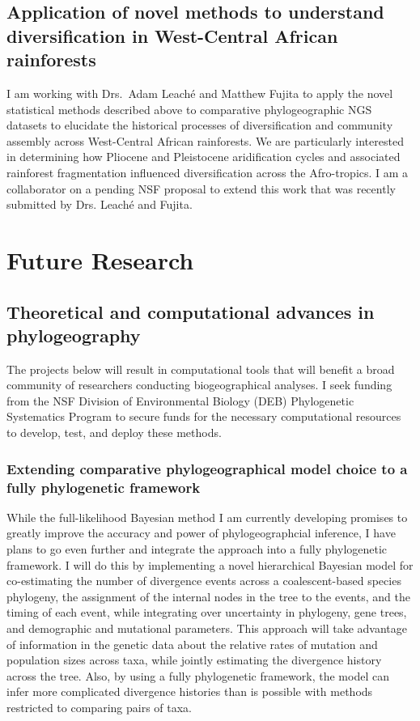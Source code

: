 \subsection*{Application of novel methods to understand diversification
in West-Central African rainforests}
I am working with Drs.\ Adam Leach\'{e} and Matthew Fujita to apply the novel
statistical methods described above to comparative phylogeographic NGS datasets
to elucidate the historical processes of diversification and community assembly
across West-Central African rainforests.
We are particularly interested in determining how Pliocene and Pleistocene
aridification cycles and associated rainforest fragmentation influenced
diversification across the Afro-tropics.
I am a collaborator on a pending NSF proposal to extend this work that was
recently submitted by Drs. Leach\'{e} and Fujita.


\section*{Future Research}

\subsection*{Theoretical and computational advances in phylogeography}
The projects below will result in computational tools that will benefit a broad
community of researchers conducting biogeographical analyses. I seek funding
from the NSF Division of Environmental Biology (DEB) Phylogenetic Systematics
Program to secure funds for the necessary computational resources to develop,
test, and deploy these methods.

\subsubsection*{Extending comparative phylogeographical model choice to a fully
    phylogenetic framework}
While the full-likelihood Bayesian method I am currently developing promises to
greatly improve the accuracy and power of phylogeographcial inference, I have
plans to go even further and integrate the approach into a fully phylogenetic
framework.
I will do this by implementing a novel hierarchical Bayesian model for
co-estimating the number of divergence events across a coalescent-based species
phylogeny, the assignment of the internal nodes in the tree to the events, and
the timing of each event, while integrating over uncertainty in phylogeny, gene
trees, and demographic and mutational parameters.
This approach will take advantage of information in the genetic data about the
relative rates of mutation and population sizes across taxa, while jointly
estimating the divergence history across the tree.
Also, by using a fully phylogenetic framework, the model can infer more
complicated divergence histories than is possible with methods restricted to
comparing pairs of taxa.

